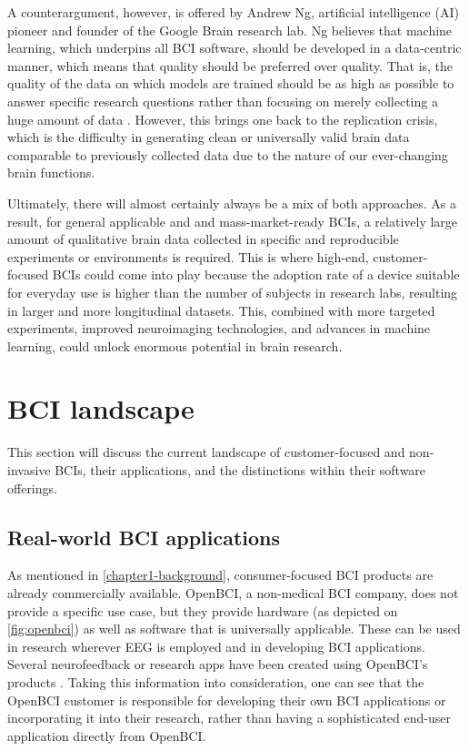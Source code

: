 A counterargument, however, is offered by Andrew Ng, artificial intelligence (AI) pioneer and founder of the Google Brain research lab. Ng believes that machine learning, which underpins all BCI software, should be developed in a data-centric manner, which means that quality should be preferred over quality. That is, the quality of the data on which models are trained should be as high as possible to answer specific research questions rather than focusing on merely collecting a huge amount of data \citep{brown_why_2022}. However, this brings one back to the replication crisis, which is the difficulty in generating clean or universally valid brain data comparable to previously collected data due to the nature of our ever-changing brain functions.

Ultimately, there will almost certainly always be a mix of both approaches. As a result, for general applicable and and mass-market-ready BCIs, a relatively large amount of qualitative brain data collected in specific and reproducible experiments or environments is required. This is where high-end, customer-focused BCIs could come into play because the adoption rate of a device suitable for everyday use is higher than the number of subjects in research labs, resulting in larger and more longitudinal datasets. This, combined with more targeted experiments, improved neuroimaging technologies, and advances in machine learning, could unlock enormous potential in brain research.

\section{BCI landscape}
\label{chapter2-research-landscape}

This section will discuss the current landscape of customer-focused and non-invasive BCIs, their applications, and the distinctions within their software offerings.

\subsection{Real-world BCI applications}
\label{chapter2-real-world-bci-applications}

As mentioned in \autoref{chapter1-background}, consumer-focused BCI products are already commercially available. OpenBCI, a non-medical BCI company, does not provide a specific use case, but they provide hardware (as depicted on \autoref{fig:openbci}) as well as software that is universally applicable. These can be used in research wherever EEG is employed and in developing BCI applications. Several neurofeedback or research apps have been created using OpenBCI’s products \citep{openbci_openbci_nodate}. Taking this information into consideration, one can see that the OpenBCI customer is responsible for developing their own BCI applications or incorporating it into their research, rather than having a sophisticated end-user application directly from OpenBCI.

